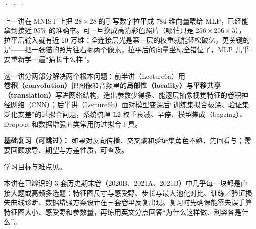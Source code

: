 



 ·  ·  · 

上一讲在 MNIST 上把 $28\times 28$ 的手写数字拉平成 784 维向量喂给 MLP，已经能拿到接近 95\% 的准确率。可一旦换成高清彩色照片（哪怕只是 $256\times 256\times 3$），拉平后输入就有近 20 万维：全连接层光是第一层的权重就能轻松破亿，更关键的是——把一张猫的照片往右挪两个像素，拉平后的向量坐标全错位了，MLP 几乎要重新学一遍“猫长什么样”。

这一讲分两部分解决两个根本问题：前半讲（Lecture6a）用\textbf{卷积（convolution）}把图像和音频里的\textbf{局部性（locality）}与\textbf{平移共享（translation）}写进网络结构，造出参数少得多、能逐层抽象视觉特征的卷积神经网络（CNN）；后半讲（Lecture6b）面对模型变深后“训练集拟合极深、验证集泛化变差”的过拟合问题，系统梳理 L2 权重衰减、早停、模型集成（bagging）、Dropout 和数据增强五类常用防过拟合工具。

\textbf{基础复习（可跳过）：} 如果对反向传播、交叉熵和验证集角色不熟，先回看与；需要回顾求导、期望与方差性质，可查及。

学习目标与难点见。



本讲在已辨识的 3 套历史期末卷（2020B、2021A、2021B）中几乎每一块都是直接大题或高频多选题：特征图尺寸与感受野、步长与最大池化对比、训练／验证损失曲线诊断、数据增强方案设计在三套卷里反复出现。复习时先确保能零失误手算特征图大小、感受野和参数量，再练用英文分点回答“为什么这样做、利弊各是什么”。

